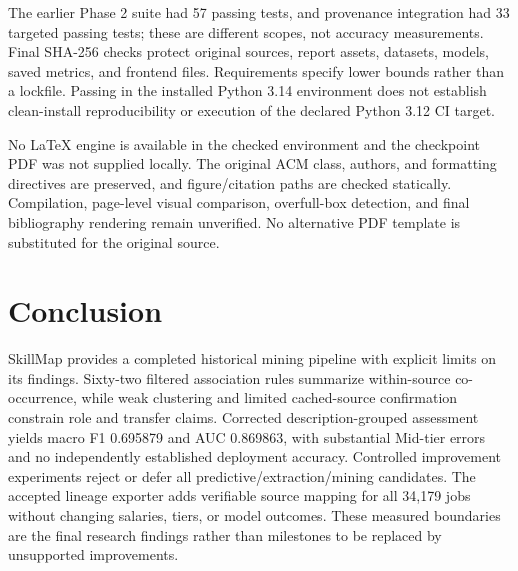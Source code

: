 \documentclass[sigconf,nonacm]{acmart}
\begin{document}
The earlier Phase 2 suite had 57 passing tests, and provenance integration had 33 targeted passing tests; these are different scopes, not accuracy measurements. Final SHA-256 checks protect original sources, report assets, datasets, models, saved metrics, and frontend files. Requirements specify lower bounds rather than a lockfile. Passing in the installed Python 3.14 environment does not establish clean-install reproducibility or execution of the declared Python 3.12 CI target.

No LaTeX engine is available in the checked environment and the checkpoint PDF was not supplied locally. The original ACM class, authors, and formatting directives are preserved, and figure/citation paths are checked statically. Compilation, page-level visual comparison, overfull-box detection, and final bibliography rendering remain unverified. No alternative PDF template is substituted for the original source.

\section{Conclusion}
SkillMap provides a completed historical mining pipeline with explicit limits on its findings. Sixty-two filtered association rules summarize within-source co-occurrence, while weak clustering and limited cached-source confirmation constrain role and transfer claims. Corrected description-grouped assessment yields macro F1 0.695879 and AUC 0.869863, with substantial Mid-tier errors and no independently established deployment accuracy. Controlled improvement experiments reject or defer all predictive/extraction/mining candidates. The accepted lineage exporter adds verifiable source mapping for all 34,179 jobs without changing salaries, tiers, or model outcomes. These measured boundaries are the final research findings rather than milestones to be replaced by unsupported improvements.
\end{document}
